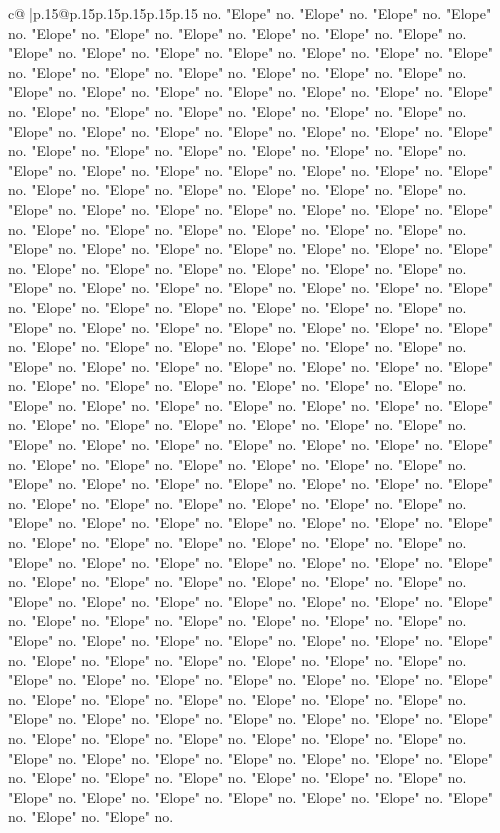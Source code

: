 \documentclass{article}
\begin{document}
{\begin{supertabular}{c@{$\;$}|p{.15\linewidth}@{}p{.15\linewidth}p{.15\linewidth}p{.15\linewidth}p{.15\linewidth}p{.15\linewidth}}
{{{no. "Elope" no. "Elope" no. "Elope" no. "Elope" no. "Elope" no. "Elope" no. "Elope" no. "Elope" no. "Elope" no. "Elope" no. "Elope" no. "Elope" no. "Elope" no. "Elope" no. "Elope" no. "Elope" no. "Elope" no. "Elope" no. "Elope" no. "Elope" no. "Elope" no. "Elope" no. "Elope" no. "Elope" no. "Elope" no. "Elope" no. "Elope" no. "Elope" no. "Elope" no. "Elope" no. "Elope" no. "Elope" no. "Elope" no. "Elope" no. "Elope" no. "Elope" no. "Elope" no. "Elope" no. "Elope" no. "Elope" no. "Elope" no. "Elope" no. "Elope" no. "Elope" no. "Elope" no. "Elope" no. "Elope" no. "Elope" no. "Elope" no. "Elope" no. "Elope" no. "Elope" no. "Elope" no. "Elope" no. "Elope" no. "Elope" no. "Elope" no. "Elope" no. "Elope" no. "Elope" no. "Elope" no. "Elope" no. "Elope" no. "Elope" no. "Elope" no. "Elope" no. "Elope" no. "Elope" no. "Elope" no. "Elope" no. "Elope" no. "Elope" no. "Elope" no. "Elope" no. "Elope" no. "Elope" no. "Elope" no. "Elope" no. "Elope" no. "Elope" no. "Elope" no. "Elope" no. "Elope" no. "Elope" no. "Elope" no. "Elope" no. "Elope" no. "Elope" no. "Elope" no. "Elope" no. "Elope" no. "Elope" no. "Elope" no. "Elope" no. "Elope" no. "Elope" no. "Elope" no. "Elope" no. "Elope" no. "Elope" no. "Elope" no. "Elope" no. "Elope" no. "Elope" no. "Elope" no. "Elope" no. "Elope" no. "Elope" no. "Elope" no. "Elope" no. "Elope" no. "Elope" no. "Elope" no. "Elope" no. "Elope" no. "Elope" no. "Elope" no. "Elope" no. "Elope" no. "Elope" no. "Elope" no. "Elope" no. "Elope" no. "Elope" no. "Elope" no. "Elope" no. "Elope" no. "Elope" no. "Elope" no. "Elope" no. "Elope" no. "Elope" no. "Elope" no. "Elope" no. "Elope" no. "Elope" no. "Elope" no. "Elope" no. "Elope" no. "Elope" no. "Elope" no. "Elope" no. "Elope" no. "Elope" no. "Elope" no. "Elope" no. "Elope" no. "Elope" no. "Elope" no. "Elope" no. "Elope" no. "Elope" no. "Elope" no. "Elope" no. "Elope" no. "Elope" no. "Elope" no. "Elope" no. "Elope" no. "Elope" no. "Elope" no. "Elope" no. "Elope" no. "Elope" no. "Elope" no. "Elope" no. "Elope" no. "Elope" no. "Elope" no. "Elope" no. "Elope" no. "Elope" no. "Elope" no. "Elope" no. "Elope" no. "Elope" no. "Elope" no. "Elope" no. "Elope" no. "Elope" no. "Elope" no. "Elope" no. "Elope" no. "Elope" no. "Elope" no. "Elope" no. "Elope" no. "Elope" no. "Elope" no. "Elope" no. "Elope" no. "Elope" no. "Elope" no. "Elope" no. "Elope" no. "Elope" no. "Elope" no. "Elope" no. "Elope" no. "Elope" no. "Elope" no. "Elope" no. "Elope" no. "Elope" no. "Elope" no. "Elope" no. "Elope" no. "Elope" no. "Elope" no. "Elope" no. "Elope" no. "Elope" no. "Elope" no. "Elope" no. "Elope" no. "Elope" no. "Elope" no. "Elope" no. "Elope" no. "Elope" no. "Elope" no. "Elope" no. "Elope" no. "Elope" no. "Elope" no. "Elope" no. "Elope" no. "Elope" no. "Elope" no. "Elope" no. "Elope" no. "Elope" no. "Elope" no. "Elope" no. "Elope" no. "Elope" no. "Elope" no. "Elope" no. "Elope" no. "Elope" no. "Elope" no. "Elope" no. "Elope" no. "Elope" no. "Elope" no. "Elope" no. "Elope" no. "Elope" no. "Elope" no. "Elope" no. "Elope" no. "Elope" no. "Elope" no. "Elope" no. "Elope" no. "Elope" no. "Elope" no. "Elope" no. "Elope" no. "Elope" no. "Elope" no. "Elope" no. "Elope" no. "Elope" no. "Elope" no. "Elope" no. }}}
\end{supertabular}}
\end{document}

